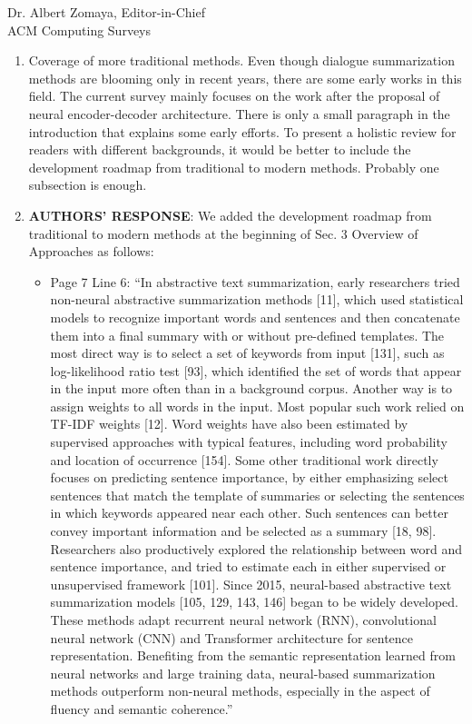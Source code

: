 \documentclass[11pt]{letter} %
\begin{document}
\begin{letter}{
Dr. Albert Zomaya, Editor-in-Chief  \\
ACM Computing Surveys}
\begin{enumerate}
	 
	
	\item Coverage of more traditional methods. Even though dialogue summarization methods are blooming only in recent years, there are some early works in this field. The current survey mainly focuses on the work after the proposal of neural encoder-decoder architecture. There is only a small paragraph in the introduction that explains some early efforts. To present a holistic review for readers with different backgrounds, it would be better to include the development roadmap from traditional to modern methods. Probably one subsection is enough.
	\item[] \textbf{AUTHORS' RESPONSE}: We added the development roadmap from traditional to modern methods at the beginning of Sec. 3 Overview of Approaches as follows:
		\begin{itemize}
			\item Page 7 Line 6: ``In abstractive text summarization, early researchers tried non-neural abstractive summarization methods [11], which used statistical models to recognize important words and sentences and then concatenate them into a final summary with or without pre-defined templates. The most direct way is to select a set of keywords from input [131], such as log-likelihood ratio test [93], which identified the set of words that appear in the input more often than in a background corpus. Another way is to assign weights to all words in the input. Most popular such work relied on TF-IDF weights [12]. Word weights have also been estimated by supervised approaches with typical features, including word probability and location of occurrence [154]. Some other traditional work directly focuses on predicting sentence importance, by either emphasizing select sentences that match the template of summaries or selecting the sentences in which keywords appeared near each other. Such sentences can better convey important information and be selected as a summary [18, 98]. Researchers also productively explored the relationship between word and sentence importance, and tried to estimate each in either supervised or unsupervised framework [101]. Since 2015, neural-based abstractive text summarization models [105, 129, 143, 146] began to be widely developed. These methods adapt recurrent neural network (RNN), convolutional neural network (CNN) and Transformer architecture for sentence representation. Benefiting from the semantic representation learned from neural networks and large training data, neural-based summarization methods outperform non-neural methods, especially in the aspect of fluency and semantic coherence.''


\end{itemize}
\end{enumerate}
\end{letter}
\end{document}
